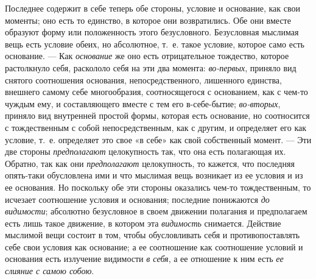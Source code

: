 Последнее содержит в себе теперь обе стороны, условие и основание, как свои
моменты; оно есть то единство, в которое они возвратились. Обе они вместе
образуют форму или положенность этого безусловного. Безусловная мыслимая
вещь есть условие обеих, но абсолютное, т.~е. такое условие, которое само
есть основание. — Как {\em основание} же оно есть
отрицательное тождество, которое растолкнуло себя, раскололо себя на эти
два момента: {\em во-первых}, приняло вид снятого
соотношения основания, непосредственного, лишенного единства, внешнего
самому себе многообразия, соотносящегося с основанием, как с чем-то чуждым
ему, и составляющего вместе с тем его в-себе-бытие;
{\em во-вторых}, приняло вид внутренней простой формы,
которая есть основание, но соотносится с тождественным с собой
непосредственным, как с другим, и определяет его как условие, т.~е.
определяет это свое «в себе» как свой собственный момент. — Эти две стороны
{\em предполагают} целокупность так, что она есть
полагающая их. Обратно, так как они {\em предполагают}
целокупность, то кажется, что последняя опять-таки обусловлена ими и что
мыслимая вещь возникает из ее условия и из ее основания. Но поскольку обе
эти стороны оказались чем-то тождественным, то исчезает соотношение условия
и основания; последние понижаются {\em до видимости};
абсолютно безусловное в своем движении полагания и предполагаем есть лишь
такое движение, в котором эта {\em видимость}
снимается. Действие мыслимой вещи состоит в том, чтобы обусловливать себя и
противопоставлять себе свои условия как основание; а ее соотношение как
соотношение условий и основания есть излучение видимости
{\em в себя}, а ее отношение к ним есть
{\em ее слияние с самою собою}.

